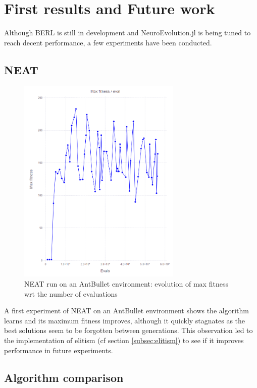 \chapter{First results and Future work}
\label{chap:results}

Although BERL is still in development and NeuroEvolution.jl is being tuned to reach decent performance, a few experiments have been conducted. 

\section{NEAT}

\begin{figure}[H]
\centering
\captionsetup{justification=centering,margin=2cm}
\includegraphics[height=10cm]{images/neat_antbullet.PNG}
\caption{NEAT run on an AntBullet environment: evolution of max fitness wrt the number of evaluations}
\end{figure}

A first experiment of NEAT on an AntBullet environment shows the algorithm learns and its maximum fitness improves, although it quickly stagnates as the best solutions seem to be forgotten between generations. This observation led to the implementation of elitism (cf section \ref{subsec:elitism}) to see if it improves performance in future experiments.

\section{Algorithm comparison}

